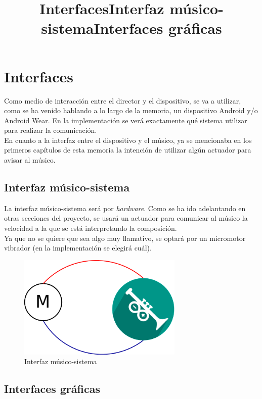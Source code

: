 \section{Interfaces}
\title{Interfaces}

Como medio de interacción entre el director y el dispositivo, se va a utilizar,
como se ha venido hablando a lo largo de la memoria, un dispositivo Android y/o
Android Wear. En la implementación se verá exactamente qué sistema utilizar
para realizar la comunicación.\\

En cuanto a la interfaz entre el dispositivo y el músico, ya se mencionaba en
los primeros capítulos de esta memoria la intención de utilizar algún actuador
para avisar al músico.\\


\subsection{Interfaz músico-sistema}
\title{Interfaz músico-sistema}

La interfaz músico-sistema será por \textit{hardware}. Como se ha ido adelantando
en otras secciones del proyecto, se usará un actuador para comunicar al músico
la velocidad a la que se está interpretando la composición.\\
Ya que no se quiere que sea algo muy llamativo, se optará
por un micromotor vibrador (en la implementación se elegirá cuál).\\

\begin{figure}[!htb]
\centering
\includegraphics[width=0.7\textwidth]{./imagenes/motorarduband}
\caption{Interfaz músico-sistema} \label{fig:motorarduband}
\end{figure}

\subsection{Interfaces gráficas}
\title{Interfaces gráficas}

